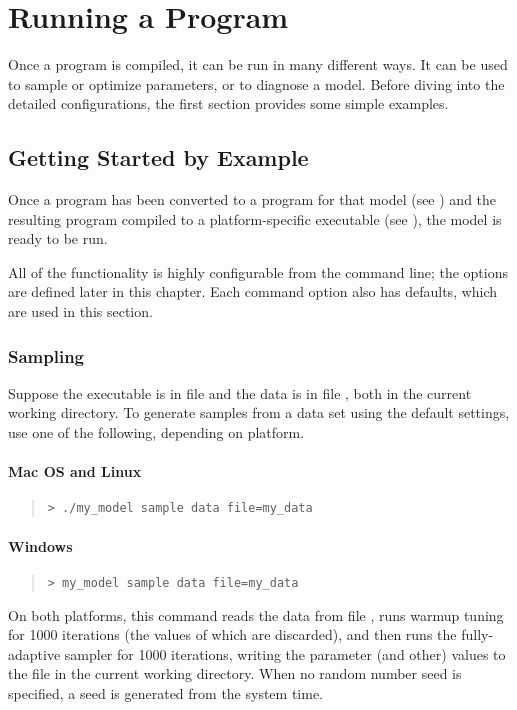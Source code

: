 \chapter{Running a \CmdStan Program}\label{stan-cmd.chapter}

\noindent
Once a \CmdStan program is compiled, it can be run in many different
ways.  It can be used to sample or optimize parameters, or to diagnose
a model.  Before diving into the detailed configurations, the first
section provides some simple examples.


\section{Getting Started by Example}\label{command-getting-started.section}

Once a \CmdStan program has been converted to a \Cpp program for that
model (see ) and the resulting \Cpp program compiled
to a platform-specific executable (see ),
the model is ready to be run.

All of the \CmdStan functionality is highly configurable from the command
line; the options are defined later in this chapter.  Each command
option also has defaults, which are used in this section.

\subsection{Sampling}

Suppose the executable is in file  and the data is in
file , both in the current working directory.  To
generate samples from a data set using the default settings, use one
of the following, depending on platform.

\subsubsection{Mac OS and Linux}
%
\begin{quote}
\begin{Verbatim}[fontshape=sl]
> ./my_model sample data file=my_data
\end{Verbatim}
\end{quote}

\subsubsection{Windows}
%
\begin{quote}
\begin{Verbatim}[fontshape=sl]
> my_model sample data file=my_data
\end{Verbatim}
\end{quote}
%
On both platforms, this command reads the data from file
, runs warmup tuning for 1000 iterations (the values of
which are discarded), and then runs the fully-adaptive \NUTS sampler
for 1000 iterations, writing the parameter (and other) values to the
file  in the current working directory.  When no
random number seed is specified, a seed is generated from the system
time.

